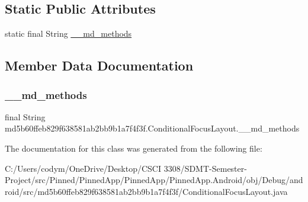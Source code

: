 \subsection*{Static Public Attributes}
\begin{DoxyCompactItemize}
\item 
static final String \hyperlink{classmd5b60ffeb829f638581ab2bb9b1a7f4f3f_1_1_conditional_focus_layout_ae43b6d64754789fb4cba8a55c430534a}{\+\_\+\+\_\+md\+\_\+methods}
\end{DoxyCompactItemize}


\subsection{Member Data Documentation}
\mbox{\label{classmd5b60ffeb829f638581ab2bb9b1a7f4f3f_1_1_conditional_focus_layout_ae43b6d64754789fb4cba8a55c430534a}} 
\subsubsection{\texorpdfstring{\+\_\+\+\_\+md\+\_\+methods}{\_\_md\_methods}}
{\footnotesize\ttfamily final String md5b60ffeb829f638581ab2bb9b1a7f4f3f.\+Conditional\+Focus\+Layout.\+\_\+\+\_\+md\+\_\+methods\hspace{0.3cm}{\ttfamily [static]}}



The documentation for this class was generated from the following file\+:\begin{DoxyCompactItemize}
\item 
C\+:/\+Users/codym/\+One\+Drive/\+Desktop/\+C\+S\+C\+I 3308/\+S\+D\+M\+T-\/\+Semester-\/\+Project/src/\+Pinned/\+Pinned\+App/\+Pinned\+App/\+Pinned\+App.\+Android/obj/\+Debug/android/src/md5b60ffeb829f638581ab2bb9b1a7f4f3f/Conditional\+Focus\+Layout.\+java\end{DoxyCompactItemize}
